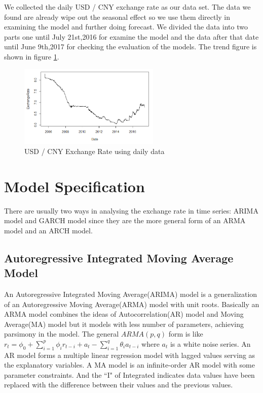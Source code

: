 \documentclass[12pt, a4paper, titlepage]{article}
\begin{document}
We collected the daily USD / CNY exchange rate as our data set. The data we found are already wipe out the seasonal effect so we use them directly in examining the model and further doing forecast. We divided the data into two parts one until July 21st,2016 for examine the model and the data after that date until June 9th,2017 for checking the evaluation of the models. The trend figure is shown in figure \ref{daily}.\\
\begin{figure}[h!]
\begin{center}
\caption{USD / CNY Exchange Rate using daily data}\label{daily}
\includegraphics[width=0.6\textwidth]{daily.png} 
\end{center}
\end{figure}

\section{Model Specification}
There are usually two ways in analysing the exchange rate in time series: ARIMA model and GARCH model since they are the more general form of an ARMA model and an ARCH model. 

\subsection{Autoregressive Integrated Moving Average Model}
An Autoregressive Integrated Moving Average(ARIMA) model is a generalization of an Autoregressive Moving Average(ARMA) model with unit roots. Basically an ARMA model combines the ideas of Autocorrelation(AR) model and Moving Average(MA) model but it models with less number of parameters, achieving parsimony in the model. The general $ARMA(p,q)$ form is like $r_t = \phi_0 + \sum_{i=1}^p \phi_i r_{t-i} + a_t - \sum_{i=1}^q \theta_i a_{t-i}$ where ${a_t}$ is a white noise series. An AR model forms a multiple linear regression model with lagged values serving as the explanatory variables. A MA model is an infinite-order AR model with some parameter constraints. And the ``I" of Integrated indicates data values have been replaced with the difference between their values and the previous values.\\
\end{document}
